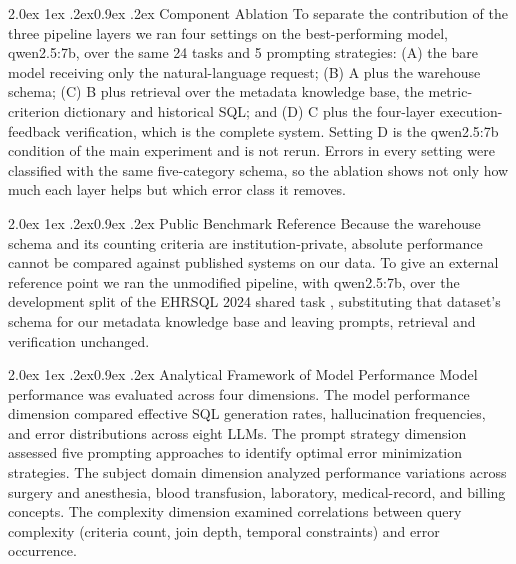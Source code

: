\documentclass[10pt]{article}
\makeatletter
\renewcommand\subsection{\@startsection{subsection}{2}{\z@}%
  {2.0ex \@plus 1ex \@minus .2ex}{0.9ex \@plus .2ex}%
  {\normalfont\normalsize\bfseries}}
\makeatother
\begin{document}
\subsection{Component Ablation}
To separate the contribution of the three pipeline layers we ran four settings
on the best-performing model, qwen2.5:7b, over the same 24 tasks and 5 prompting
strategies: (A) the bare model receiving only the natural-language request;
(B) A plus the warehouse schema; (C) B plus retrieval over the metadata knowledge
base, the metric-criterion dictionary and historical SQL; and (D) C plus the
four-layer execution-feedback verification, which is the complete system.
Setting D is the qwen2.5:7b condition of the main experiment and is not rerun.
Errors in every setting were classified with the same five-category schema, so
the ablation shows not only how much each layer helps but which error class it
removes.

\subsection{Public Benchmark Reference}
Because the warehouse schema and its counting criteria are institution-private,
absolute performance cannot be compared against published systems on our data.
To give an external reference point we ran the unmodified pipeline, with
qwen2.5:7b, over the development split of the EHRSQL 2024 shared task
\cite{ehrsql2024}, substituting that dataset's schema for our metadata knowledge
base and leaving prompts, retrieval and verification unchanged.

\subsection{Analytical Framework of Model Performance}
Model performance was evaluated across four dimensions. The model performance
dimension compared effective SQL generation rates, hallucination frequencies,
and error distributions across eight LLMs. The prompt strategy dimension
assessed five prompting approaches to identify optimal error minimization
strategies. The subject domain dimension analyzed performance variations across
surgery and anesthesia, blood transfusion, laboratory, medical-record, and
billing concepts. The complexity dimension examined correlations between query
complexity (criteria count, join depth, temporal constraints) and error
occurrence.
\end{document}
